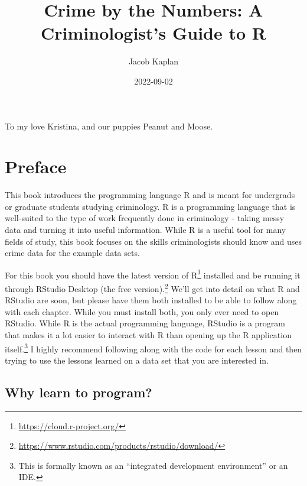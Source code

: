 \documentclass[
  a4paper,
]{krantz}
\title{Crime by the Numbers: A Criminologist's Guide to R}
\author{Jacob Kaplan}
\date{2022-09-02}
\renewcommand{\href}[2]{#2\footnote{\url{#1}}}
\begin{document}
\maketitle

\thispagestyle{empty}
\begin{center}
To my love Kristina, and our puppies Peanut and Moose.
\end{center}

\setlength{\abovedisplayskip}{-5pt}
\setlength{\abovedisplayshortskip}{-5pt}

{
\hypersetup{linkcolor=}
\setcounter{tocdepth}{2}
\tableofcontents
}

\frontmatter

\hypertarget{preface}{%
\chapter*{Preface}\label{preface}}


This book introduces the programming language R and is meant
for undergrads or graduate students studying criminology. R
is a programming language that is well-suited to the type of
work frequently done in criminology - taking messy data and
turning it into useful information. While R is a useful tool
for many fields of study, this book focuses on the skills
criminologists should know and uses crime data for the
example data sets.

For this book you should have the latest version of
\href{https://cloud.r-project.org/}{R} installed and be
running it through
\href{https://www.rstudio.com/products/rstudio/download/}{RStudio
Desktop (the free version).} We'll get into detail on what R
and RStudio are soon, but please have them both installed to
be able to follow along with each chapter. While you must
install both, you only ever need to open RStudio. While R is
the actual programming language, RStudio is a program that
makes it a lot easier to interact with R than opening up the
R application itself.\footnote{This is formally known as an
  ``integrated development environment'' or an IDE.} I
highly recommend following along with the code for each
lesson and then trying to use the lessons learned on a data
set that you are interested in.

\hypertarget{why-learn-to-program}{%
\section*{Why learn to
program?}\label{why-learn-to-program}}
\end{document}
